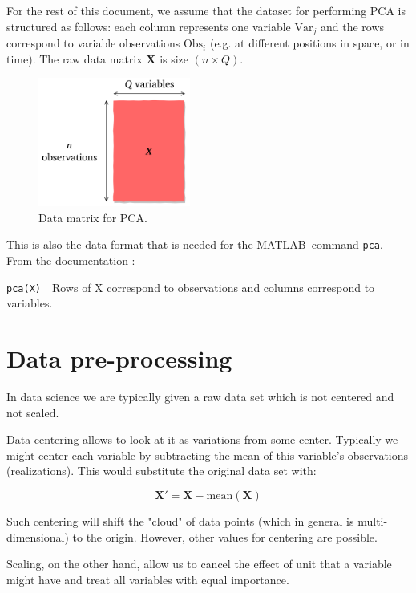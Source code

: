 \documentclass[10pt,twocolumn]{article}
\begin{document}
For the rest of this document, we assume that the dataset for performing PCA is structured as follows: each column represents one variable $\text{Var}_j$ and the rows correspond to variable observations $\text{Obs}_i$ (e.g. at different positions in space, or in time). The raw data matrix $\bm{X}$ is size $(n \times Q)$.

\begin{figure}[H]
\centering\includegraphics[width=5cm]{data-set-PCA.png}
\caption{Data matrix for PCA.}
\label{fig:data-matrix}
\end{figure}

This is also the data format that is needed for the MATLAB\textregistered \, command \texttt{pca}. From the documentation \cite{Matlab-pca}:


\begin{framed}
\texttt{pca(X)}
\,\,
Rows of X correspond to observations and columns correspond to variables.
\end{framed}

\section{Data pre-processing}

In data science we are typically given a raw data set which is not centered and not scaled. 

Data centering allows to look at it as variations from some center. Typically we might center each variable by subtracting the mean of this variable's observations (realizations). This would substitute the original data set with:

\begin{equation}
\bm{X'} = \bm{X} - \text{mean}(\bm{X})
\end{equation}

Such centering will shift the "cloud" of data points (which in general is multi-dimensional) to the origin. However, other values for centering are possible.

Scaling, on the other hand, allow us to cancel the effect of unit that a variable might have and treat all variables with equal importance. 
\end{document}
